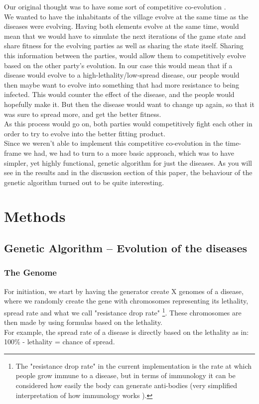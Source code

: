 \documentclass[conference,compsoc]{IEEEtran}
\begin{document}
Our original thought was to have some sort of competitive co-evolution \cite{rosin1995methods}.\\
We wanted to have the inhabitants of the village evolve at the same time as the diseases were evolving. Having both elements evolve at the same time, would mean that we would have to simulate the next iterations of the game state and share fitness for the evolving parties as well as sharing the state itself. Sharing this information between the parties, would allow them to competitively evolve based on the other party's evolution. In our case this would mean that if a disease would evolve to a high-lethality/low-spread disease, our people would then maybe want to evolve into something that had more resistance to being infected. This would counter the effect of the disease, and the people would hopefully make it. But then the disease would want to change up again, so that it was sure to spread more, and get the better fitness.\\
As this process would go on, both parties would competitively fight each other in order to try to evolve into the better fitting product.\\

Since we weren't able to implement this competitive co-evolution in the time-frame we had, we had to turn to a more basic approach, which was to have simpler, yet highly functional, genetic algorithm for just the diseases.  As you will see in the results and in the discussion section of this paper, the behaviour of the genetic algorithm turned out to be quite interesting.\\

\section{Methods}
\subsection{Genetic Algorithm – Evolution of the diseases}
\subsubsection{The Genome}
For initiation, we start by having the generator create X genomes of a disease, where we randomly create the gene with chromosomes representing its lethality, spread rate and what we call "resistance drop rate" \footnote{The "resistance drop rate" in the current implementation is the rate at which people grow immune to a disease, but in terms of immunology it can be considered how easily the body can generate anti-bodies (very simplified interpretation of how immunology works \cite{DSDimmunology}).}. These chromosomes are then made by using formulas based on the lethality.\\
For example, the spread rate of a disease is directly based on the lethality as in: 100\% - lethality = chance of spread.\\
\end{document}
